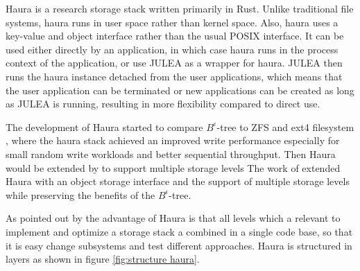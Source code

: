 \documentclass[
	12pt,
	a4paper,
	abstract,
	bibliography=totoc,
	chapterprefix,
	headings=openright,
	numbers=endperiod,
	parskip=half,
	twoside,
]{scrreprt}
\begin{document}

Haura is a research storage stack written primarily in Rust.
Unlike traditional file systems, haura runs in user space rather than kernel space.
Also, haura uses a key-value and object interface rather than the usual POSIX interface.
It can be used either directly by an application, in which case haura runs in the process context of the application, or
use JULEA as a wrapper for haura.
JULEA then runs the haura instance detached from the user applications, which means that the user application can be terminated or new applications can be created as long as JULEA is running, resulting in more flexibility compared to direct use.


The development of Haura started to compare $B^{\epsilon}$-tree to ZFS and ext4 filesystem \cite{wiedemann2018modern}, where the haura stack
achieved an improved write performance especially for small random write workloads and better sequential throughput.
Then Haura would be extended by \cite{hoppner2021design} to support multiple storage levels
The work of \cite{hoppner2021design} extended Haura with an object storage interface and the support of multiple storage levels while preserving the benefits of the $B^{\epsilon}$-tree.

As pointed out by \cite{wunsche2022data} the advantage of Haura is that all levels which a relevant to implement and optimize a storage stack a combined in a single code base, so that it is easy change subsystems and test different approaches.
Haura is structured in layers as shown in figure \ref{fig:structure haura}.
\end{document}
